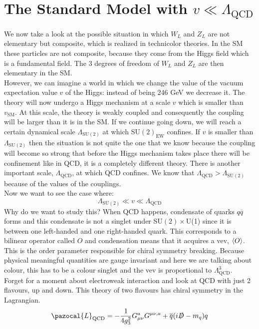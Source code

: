 \documentclass[../main.tex]{subfiles}
\begin{document}
\section{The Standard Model with $v\ll\Lambda_{\text{QCD}}$}
We now take a look at the possible situation in which $W_L$ and $Z_L$ are not elementary but composite, which is realized in technicolor theories.  In the SM these particles are not composite, because they come from the Higgs field which is a fundamental field. The 3 degrees of freedom of $W_L$ and $Z_L$ are then elementary in the SM.\\
However, we can imagine a world in which we change the value of the vacuum expectation value $v$ of the Higgs: instead of being 246 GeV we decrease it. The theory will now undergo a Higgs mechanism at a scale $v$ which is smaller than $v_{\text{SM}}$. At this scale, the theory is weakly coupled and consequently the coupling will be larger than it is in the SM. If we continue going down, we will reach a certain dynamical scale $\Lambda_{\text{SU}(2)}$ at which SU$(2)_{\text{EW}}$ confines. If $v$ is smaller than $\Lambda_{\text{SU}(2)}$ then the situation is not quite the one that we know because the coupling will become so strong that before the Higgs mechanism takes place there will be confinement like in QCD, it is a completely different theory. There is another important scale, $\Lambda_{\text{QCD}}$, at which QCD confines. We know that $\Lambda_{\text{QCD}}>\Lambda_{\text{SU}(2)}$ because of the values of the couplings.\\
Now we want to see the case where:
\[
\Lambda_{\text{SU}(2)}\ll v\ll\Lambda_{\text{QCD}}
\]
Why do we want to study this? When QCD happens, condensate of quarks $q\overline{q}$ forms and this condensate is not a singlet under SU$(2)\times$U(1) since it is between one left-handed and one right-handed quark. This corresponds to a bilinear operator called $O$ and condensation means that it acquires a vev, $\Braket{O}$. This is the order parameter responsible for chiral symmetry breaking. Because physical meaningful quantities are gauge invariant and here we are talking about colour, this has to be a colour singlet and the vev is proportional to $\Lambda_{\text{QCD}}^3$.\\
Forget for a moment about electroweak interaction and look at QCD with just 2 flavours, up and down. This theory of two flavours has chiral symmetry in the Lagrangian.
\[
\pazocal{L}_{\text{QCD}}=-\frac{1}{4g_3^2}G_{\mu\nu}^aG^{\mu\nu,a}+\overline{q}(i\slashed{D}-m_q)q
\]
\end{document}
